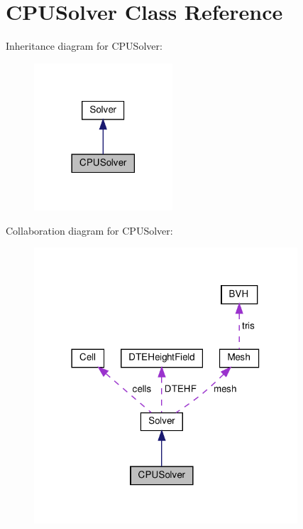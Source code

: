 \hypertarget{classCPUSolver}{}\section{C\+P\+U\+Solver Class Reference}
\label{classCPUSolver}


Inheritance diagram for C\+P\+U\+Solver\+:
\nopagebreak
\begin{figure}[H]
\begin{center}
\leavevmode
\includegraphics[width=146pt]{classCPUSolver__inherit__graph}
\end{center}
\end{figure}


Collaboration diagram for C\+P\+U\+Solver\+:
\nopagebreak
\begin{figure}[H]
\begin{center}
\leavevmode
\includegraphics[width=278pt]{classCPUSolver__coll__graph}
\end{center}
\end{figure}
